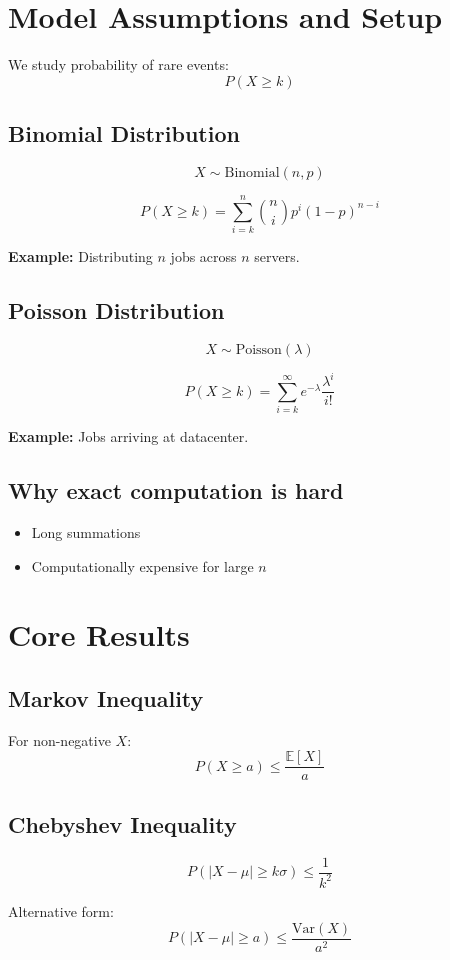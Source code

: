\documentclass[12pt]{article}
\begin{document}
\section{Model Assumptions and Setup}

We study probability of rare events:
\[
P(X \ge k)
\]

\subsection{Binomial Distribution}
\[
X \sim \text{Binomial}(n,p)
\]

\[
P(X \ge k) = \sum_{i=k}^{n} \binom{n}{i} p^i (1-p)^{n-i}
\]

\textbf{Example:} Distributing $n$ jobs across $n$ servers.

\subsection{Poisson Distribution}
\[
X \sim \text{Poisson}(\lambda)
\]

\[
P(X \ge k) = \sum_{i=k}^{\infty} e^{-\lambda} \frac{\lambda^i}{i!}
\]

\textbf{Example:} Jobs arriving at datacenter.

\subsection{Why exact computation is hard}
\begin{itemize}
\item Long summations
\item Computationally expensive for large $n$
\end{itemize}

\section{Core Results}

\subsection{Markov Inequality}
For non-negative $X$:
\[
P(X \ge a) \le \frac{\mathbb{E}[X]}{a}
\]

\subsection{Chebyshev Inequality}
\[
P(|X - \mu| \ge k\sigma) \le \frac{1}{k^2}
\]

Alternative form:
\[
P(|X - \mu| \ge a) \le \frac{\mathrm{Var}(X)}{a^2}
\]
\end{document}
